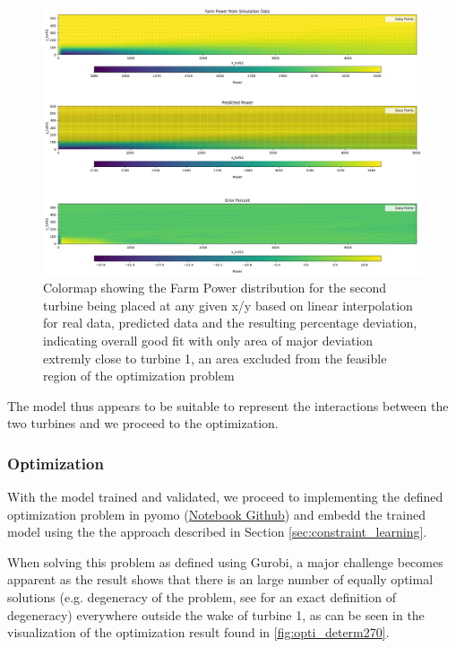\begin{figure}[h] 
	\centering
	\includegraphics[width=1\textwidth]{figures/optimization/determ_model_colormap.png} 
	\caption{Colormap showing the Farm Power distribution for the second turbine being placed at any given x/y based on linear interpolation for real data, predicted data and the resulting percentage deviation, indicating overall good fit with only area of major deviation extremly close to turbine 1, an area excluded from the feasible region of the optimization problem }
	\label{fig:determ_model_colormap}
\end{figure}

The model thus appears to be suitable to represent the interactions between the two turbines and we proceed to the optimization.

\subsubsection{Optimization}


With the model trained and validated, we proceed to implementing the defined optimization problem in pyomo  (\href{https://github.com/schmeti/uc3m_TFM_wind_farm_optimization_codebase/blob/main/Windfarm_power_modelling/0_two_turbine_problem_constrLearn_determin.ipynb}{Notebook Github}) and embedd the trained model using the the approach described in Section \ref{sec:constraint_learning}.

When solving this problem as defined using Gurobi, a major challenge becomes apparent as the result shows that there is an large number of equally optimal solutions (e.g. degeneracy of the problem, see  \cite{vanderbei2020chapter3} for an exact definition of degeneracy) everywhere outside the wake of turbine 1, as can be seen  in the visualization of the optimization result found in \ref{fig:opti_determ270}.


